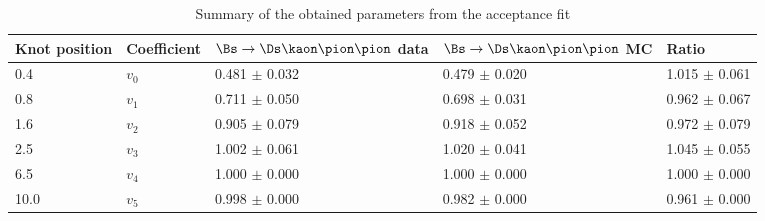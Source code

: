 \begin{table}[h]
\centering
\caption{Summary of the obtained parameters from the acceptance fit} 
\begin{tabular}{l l l l l}
\hline
\hline
Knot position & Coefficient & $\Bs\to\Ds\kaon\pion\pion$ data & $\Bs\to\Ds\kaon\pion\pion$ MC & Ratio \\
\hline
0.4 & $v_{0}$ & 0.481 $\pm$ 0.032 & 0.479 $\pm$ 0.020 & 1.015 $\pm$ 0.061\\
0.8 & $v_{1}$ & 0.711 $\pm$ 0.050 & 0.698 $\pm$ 0.031 & 0.962 $\pm$ 0.067\\
1.6 & $v_{2}$ & 0.905 $\pm$ 0.079 & 0.918 $\pm$ 0.052 & 0.972 $\pm$ 0.079\\
2.5 & $v_{3}$ & 1.002 $\pm$ 0.061 & 1.020 $\pm$ 0.041 & 1.045 $\pm$ 0.055\\
6.5 & $v_{4}$ & 1.000 $\pm$ 0.000 & 1.000 $\pm$ 0.000 & 1.000 $\pm$ 0.000\\
10.0 & $v_{5}$ & 0.998 $\pm$ 0.000 & 0.982 $\pm$ 0.000 & 0.961 $\pm$ 0.000\\
\hline
\hline
\end{tabular}
\label{table:splines}
\end{table}

